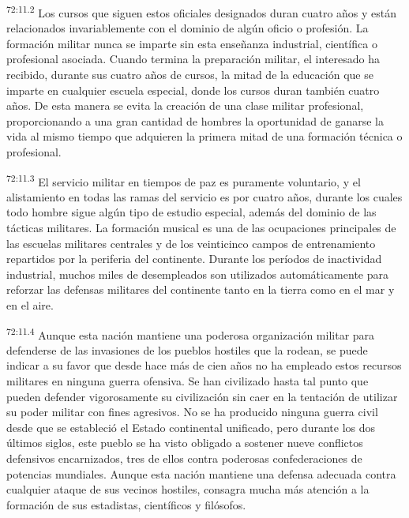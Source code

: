 \par
\textsuperscript{72:11.2} Los cursos que siguen estos oficiales designados duran cuatro años y están relacionados invariablemente con el dominio de algún oficio o profesión. La formación militar nunca se imparte sin esta enseñanza industrial, científica o profesional asociada. Cuando termina la preparación militar, el interesado ha recibido, durante sus cuatro años de cursos, la mitad de la educación que se imparte en cualquier escuela especial, donde los cursos duran también cuatro años. De esta manera se evita la creación de una clase militar profesional, proporcionando a una gran cantidad de hombres la oportunidad de ganarse la vida al mismo tiempo que adquieren la primera mitad de una formación técnica o profesional.

\par
\textsuperscript{72:11.3} El servicio militar en tiempos de paz es puramente voluntario, y el alistamiento en todas las ramas del servicio es por cuatro años, durante los cuales todo hombre sigue algún tipo de estudio especial, además del dominio de las tácticas militares. La formación musical es una de las ocupaciones principales de las escuelas militares centrales y de los veinticinco campos de entrenamiento repartidos por la periferia del continente. Durante los períodos de inactividad industrial, muchos miles de desempleados son utilizados automáticamente para reforzar las defensas militares del continente tanto en la tierra como en el mar y en el aire.

\par
\textsuperscript{72:11.4} Aunque esta nación mantiene una poderosa organización militar para defenderse de las invasiones de los pueblos hostiles que la rodean, se puede indicar a su favor que desde hace más de cien años no ha empleado estos recursos militares en ninguna guerra ofensiva. Se han civilizado hasta tal punto que pueden defender vigorosamente su civilización sin caer en la tentación de utilizar su poder militar con fines agresivos. No se ha producido ninguna guerra civil desde que se estableció el Estado continental unificado, pero durante los dos últimos siglos, este pueblo se ha visto obligado a sostener nueve conflictos defensivos encarnizados, tres de ellos contra poderosas confederaciones de potencias mundiales. Aunque esta nación mantiene una defensa adecuada contra cualquier ataque de sus vecinos hostiles, consagra mucha más atención a la formación de sus estadistas, científicos y filósofos.

